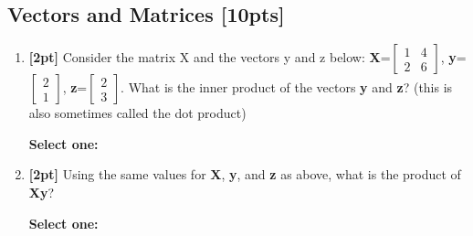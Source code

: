 \documentclass[12pt]{article}
\renewcommand{\circle}{\tikz\draw[black] (0,0) circle (1ex);}
\begin{document}
\subsection{Vectors and Matrices [10pts]}
\begin{enumerate}
    \item \textbf{[2pt]} Consider the matrix X and the vectors y and z below: \textbf{X}=$\begin{bmatrix} 1 & 4 \\ 2 & 6 \end{bmatrix}$, \textbf{y}=$\begin{bmatrix} 2 \\ 1 \end{bmatrix}$, \textbf{z}=$\begin{bmatrix} 2 \\ 3 \end{bmatrix}$. What is the inner product of the vectors \textbf{y} and \textbf{z}? (this is also sometimes called the dot product)

    \textbf{Select one:}



    \item \textbf{[2pt]} Using the same values for \textbf{X}, \textbf{y}, and \textbf{z} as above, what is the product of \textbf{Xy}?

    \textbf{Select one:}




\end{enumerate}
\end{document}
